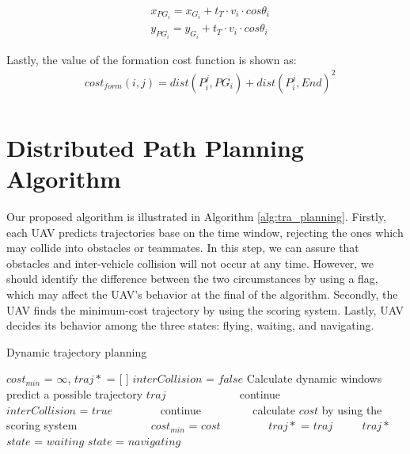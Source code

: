 \begin{equation}
\begin{aligned}
& x_{PG_{i}} = x_{G_{i}} + t_{T}\cdot v_{i}\cdot cos\theta_{i} \\
& y_{PG_{i}} = y_{G_{i}} + t_{T}\cdot v_{i}\cdot cos\theta_{i} 
\end{aligned}
\end{equation}

Lastly, the value of the formation cost function is shown as:
\begin{equation}
\begin{aligned}
& cost_{form}(i, j) = dist(P^{j}_{i}, PG_{i}) + dist(P^{j}_{i}, End)^2 \\
\end{aligned}
\end{equation}


\section{Distributed Path Planning Algorithm}
Our proposed algorithm is illustrated in Algorithm \ref{alg:tra_planning}. Firstly, each UAV predicts trajectories base on the time window, rejecting the ones which may collide into obstacles or teammates. In this step, we can assure that obstacles and inter-vehicle collision will not occur at any time. However, we should identify the difference between the two circumstances by using a flag, which may affect the UAV's behavior at the final of the algorithm. Secondly, the UAV finds the minimum-cost trajectory by using the scoring system. Lastly, UAV decides its behavior among the three states: flying, waiting, and navigating.

\begin{algorithm}[htbp] 
\caption{\label{alg:tra_planning} Dynamic trajectory planning}
\begin{algorithmic}[1]
\State $cost_{min}$ = $\infty$, $traj*$ = [ ]
\State $interCollision$ = $false$
\State Calculate dynamic windows
        \State predict a possible trajectory $traj$
    　　　　\State continue
    　　\EndIf
    　　　　\State $interCollision$ = $true$
    　　　　\State continue
    　　\EndIf
    　　\State calculate $cost$ by using the scoring system 
    　　　　\State $cost_{min}$ = $cost$
    　　　　\State $traj*$ = $traj$
    　　\EndIf
    \EndFor
\EndFor
{}
    \State \Return $traj*$
        \State \Return $state$ = $waiting$
    \EndIf
\EndIf
\State \Return $state$ = $navigating$

\end{algorithmic}
\end{algorithm}

